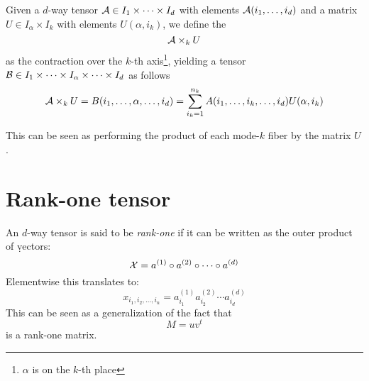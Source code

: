 \begin{Def}
  Given a $d$-way tensor $\mathcal{A} \in I_1 \times \cdots \times I_d$ with elements $\mathcal{A}(i_1,\ldots,i_d)$ and a matrix $U \in I_\alpha \times I_k$ with elements $U(\alpha,i_k)$, we define the 
  \begin{equation*}
    \mathcal{A} \times_k U
  \end{equation*}
  as the contraction over the $k$-th axis\footnote{$\alpha$ is on the $k$-th place}, yielding a tensor $\mathcal{B} \in I_1 \times \cdots \times I_\alpha \times \cdots \times I_d$ as follows
  \begin{equation*}
    \mathcal{A} \times_k U = B(i_1,\ldots,\alpha,\ldots,i_d) = \sum_{i_k = 1}^{n_k} A(i_1,\ldots,i_k,\ldots,i_d) U(\alpha,i_k)
  \end{equation*}
\end{Def}
This can be seen as performing the product of each mode-$k$ fiber by the matrix $U$.

\section{Rank-one tensor}
An $d$-way tensor \X is said to be \emph{rank-one} if it can be written as the outer product of \d vectors:
\begin{equation}
  \mathcal{X} = a^{(1)} \circ a^{(2)} \circ \cdots \circ a^{(d)}
\end{equation}
Elementwise this translates to:
\begin{equation}
  x_{i_1,i_2,\ldots,i_n} = a_{i_1}^{(1)} a_{i_2}^{(2)} \cdots a_{i_d}^{(d)}
\end{equation}
This can be seen as a generalization of the fact that
\begin{equation*}
  M = u v^t
\end{equation*}
is a rank-one matrix.

